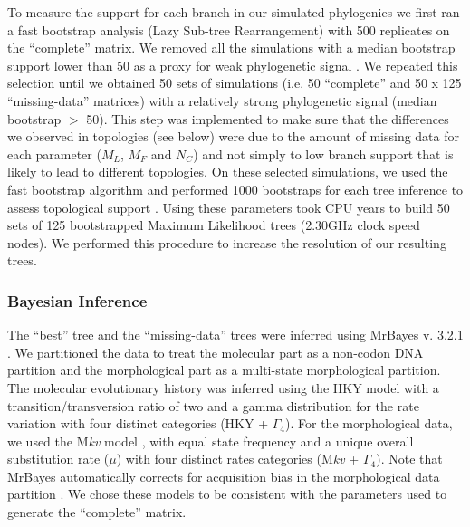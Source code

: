 \documentclass[12pt,letterpaper]{article}
\begin{document}
To measure the support for each branch in our simulated phylogenies we first ran a fast bootstrap analysis (Lazy Sub-tree Rearrangement) with 500 replicates on the ``complete'' matrix.
We removed all the simulations with a median bootstrap support lower than 50 as a proxy for weak phylogenetic signal \citep{zanderminimal2004}.
We repeated this selection until we obtained 50 sets of simulations (i.e. 50 ``complete'' and 50 x 125 ``missing-data'' matrices) with a relatively strong phylogenetic signal (median bootstrap $>$ 50).
This step was implemented to make sure that the differences we observed in topologies (see below) were due to the amount of missing data for each parameter ($M_L$, $M_F$ and $N_C$) and not simply to low branch support that is likely to lead to different topologies.
On these selected simulations, we used the fast bootstrap algorithm and performed 1000 bootstraps for each tree inference to assess topological support \citep{pattengale2010many}.
Using these parameters took  CPU years to build 50 sets of 125 bootstrapped Maximum Likelihood trees (2.30GHz clock speed nodes). We performed this procedure to increase the resolution of our resulting trees. 

\subsubsection{Bayesian Inference}
The ``best'' tree and the ``missing-data'' trees were inferred using MrBayes v. 3.2.1 \citep{Ronquist2012mrbayes}.
We partitioned the data to treat the molecular part as a non-codon DNA partition and the morphological part as a multi-state morphological partition.
The molecular evolutionary history was inferred using the HKY model with a transition/transversion ratio of two \citep{douadycomparison2003} and a gamma distribution for the rate variation with four distinct categories (HKY + $\Gamma_4$).
For the morphological data, we used the M\textit{kv} model \citep{lewisa2001}, with equal state frequency and a unique overall substitution rate ($\mu$) with four distinct rates categories (M\textit{kv} + $\Gamma_4$).
Note that MrBayes automatically corrects for acquisition bias in the morphological data partition \citep{Nylander01022004,Ronquist2012mrbayes}.
We chose these models to be consistent with the parameters used to generate the ``complete'' matrix.
\end{document}
